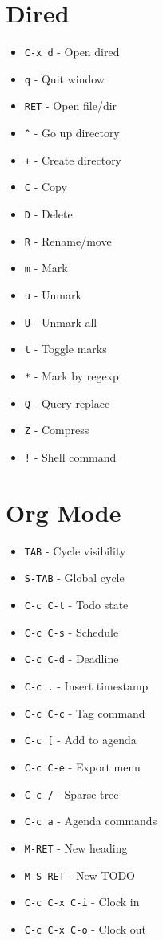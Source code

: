 \documentclass[6pt,landscape]{article}
\newcommand{\key}[1]{\texttt{#1}}
\begin{document}
\begin{multicols*}{5}
\section*{Dired}
\begin{itemize}[leftmargin=*,itemsep=0pt,parsep=0pt,topsep=0pt]
\item \key{C-x d} - Open dired
\item \key{q} - Quit window
\item \key{RET} - Open file/dir
\item \key{\textasciicircum} - Go up directory
\item \key{+} - Create directory
\item \key{C} - Copy
\item \key{D} - Delete
\item \key{R} - Rename/move
\item \key{m} - Mark
\item \key{u} - Unmark
\item \key{U} - Unmark all
\item \key{t} - Toggle marks
\item \key{*} - Mark by regexp
\item \key{Q} - Query replace
\item \key{Z} - Compress
\item \key{!} - Shell command
\end{itemize}

\section*{Org Mode}
\begin{itemize}[leftmargin=*,itemsep=0pt,parsep=0pt,topsep=0pt]
\item \key{TAB} - Cycle visibility
\item \key{S-TAB} - Global cycle
\item \key{C-c C-t} - Todo state
\item \key{C-c C-s} - Schedule
\item \key{C-c C-d} - Deadline
\item \key{C-c .} - Insert timestamp
\item \key{C-c C-c} - Tag command
\item \key{C-c [} - Add to agenda
\item \key{C-c C-e} - Export menu
\item \key{C-c /} - Sparse tree
\item \key{C-c a} - Agenda commands
\item \key{M-RET} - New heading
\item \key{M-S-RET} - New TODO
\item \key{C-c C-x C-i} - Clock in
\item \key{C-c C-x C-o} - Clock out
\end{itemize}


\end{multicols*}
\end{document}
